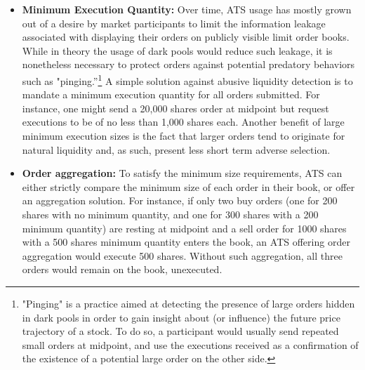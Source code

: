 \begin{itemize}
\item{\textbf{Minimum Execution Quantity:}} Over time, ATS usage has mostly grown out of a desire by market participants to limit the information leakage associated with displaying their orders on publicly visible limit order books. While in theory the usage of dark pools would reduce such leakage, it is nonetheless necessary to protect orders against potential predatory behaviors such as "pinging.''\footnote{"Pinging" is a practice aimed at detecting the presence of large orders hidden in dark pools in order to gain insight about (or influence) the future price trajectory of a stock. To do so, a participant would usually send repeated small orders at midpoint, and use the executions received as a confirmation of the existence of a potential large order on the other side.} A simple solution against abusive liquidity detection is to mandate a minimum execution quantity for all orders submitted. For instance, one might send a 20,000 shares order at midpoint but request executions to be of no less than 1,000 shares each. Another benefit of large minimum execution sizes is the fact that larger orders tend to originate for natural liquidity and, as such, present less short term adverse selection.  

\item{\textbf{Order aggregation:}} To satisfy the minimum size requirements, ATS can either strictly compare the minimum size of each order in their book, or offer an aggregation solution. For instance, if only two buy orders (one for 200 shares with no minimum quantity, and one for 300 shares with a 200 minimum quantity) are resting at midpoint and a sell order for 1000 shares with a 500 shares minimum quantity enters the book, an ATS offering order aggregation would execute 500 shares. Without such aggregation, all three orders would remain on the book, unexecuted.


\end{itemize}
